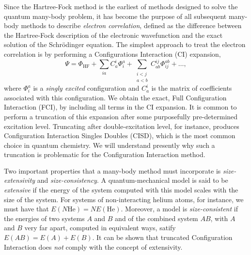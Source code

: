     Since the Hartree-Fock method is the earliest of methods designed to solve the quantum 
    many-body problem, it has become the purpose of all subsequent many-body methods to describe 
    \emph{electron correlation}, defined as the difference between the 
    Hartree-Fock description of the electronic wavefunction and the exact solution of 
    the Schrödinger equation. The simplest approach to treat the electron correlation
    is by performing a Configurations Interaction (CI) expansion,
    \begin{equation}
        \Psi = \Phi_\text{HF} 
            + \sum_{ia} C^i_a\Phi^a_i 
            + \sum_{\substack{i < j \\ a < b}} C^{ij}_{ab} \Phi^{ab}_{ij} + \dots,
    \end{equation}
    where $\Phi^a_i$ is a \emph{singly excited} configuration and $C^i_a$ is the matrix of 
    coefficients associated with this configuration. We obtain the exact,
    Full Configuration Interaction (FCI), by including all terms in the CI expansion.
    It is common to perform a truncation of this expansion after some purposefully 
    pre-determined excitation level. Truncating after 
    double-excitation level, for instance, produces Configuration Interaction Singles Doubles (CISD), 
    which is the most common choice in quantum chemistry.
    We will understand presently why such a truncation is problematic for the Configuration
    Interaction method.

    Two important properties that a many-body method must incorporate is \emph{size-extensivity}
    and \emph{size-consistency}. A quantum-mechanical model is said to be \emph{extensive}
    if the energy of the system computed with this model scales with the size of the 
    system\cite{bartlett1978many}. For systems of non-interacting helium atoms, for instance,
    we must have that $E(N\text{He}) = NE(\text{He})$. Moreover, a model is \emph{size-consistent}
    if the energies of two systems $A$ and $B$ and of the combined system $AB$, with 
    $A$ and $B$ very far apart, computed in equivalent ways, satify
    $E(AB) = E(A) + E(B)$\cite{pople1976theoretical}. It can be shown that 
    truncated Configuration Interaction does \emph{not} comply with the concept of
    extensivity\cite{shavitt2009many}.


